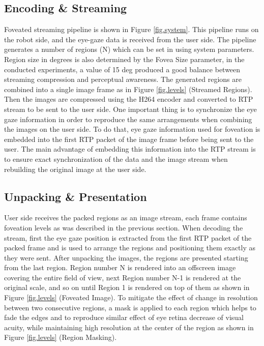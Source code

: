 \subsection{Encoding \& Streaming}

Foveated streaming pipeline is shown in Figure \ref{fig.system}. This pipeline runs on the robot side, and the eye-gaze data is received from the user side. The pipeline generates a number of regions (N) which can be set in using system parameters. Region size in degrees is also determined by the Fovea Size parameter, in the conducted experiments, a value of 15 deg produced a good balance between streaming compression and perceptual awareness. The generated regions are combined into a single image frame as in Figure \ref{fig.levels} (Streamed Regions). Then the images are compressed using the H264 encoder and converted to RTP stream to be sent to the user side. One important thing is to synchronize the eye gaze information in order to reproduce the same arrangements when combining the images on the user side. To do that, eye gaze information used for foveation is embedded into the first RTP packet of the image frame before being sent to the user. The main advantage of embedding this information into the RTP stream is to ensure exact synchronization of the data and the image stream when rebuilding the original image at the user side.

\subsection{Unpacking \& Presentation}

User side receives the packed regions as an image stream, each frame contains foveation levels as was described in the previous section. When decoding the stream,  first the eye gaze position is extracted from the first RTP packet of the packed frame and is used to arrange the regions and positioning them exactly as they were sent. After unpacking the images, the regions are presented starting from the last region. Region number N is rendered into an offscreen image covering the entire field of view, next Region number N-1 is rendered at the original scale, and so on until Region 1 is rendered on top of them as shown in Figure \ref{fig.levels} (Foveated Image). To mitigate the effect of change in resolution between two consecutive regions, a mask is applied to each region which helps to fade the edges and to reproduce similar effect of eye retina decrease of visual acuity, while maintaining high resolution at the center of the region as shown in Figure \ref{fig.levels} (Region Masking).

